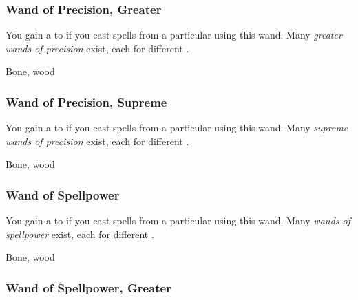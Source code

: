 \lowercase{\hypertarget{item:Wand of Precision, Greater}{}}\label{item:Wand of Precision, Greater}
\hypertarget{item:Wand of Precision, Greater}{\subsubsection{Wand of Precision, Greater\hfill{}}}

You gain a   to  if you cast spells from a particular  using this wand.
Many \textit{greater wands of precision} exist, each for different .



 


 Bone, wood


\lowercase{\hypertarget{item:Wand of Precision, Supreme}{}}\label{item:Wand of Precision, Supreme}
\hypertarget{item:Wand of Precision, Supreme}{\subsubsection{Wand of Precision, Supreme\hfill{}}}

You gain a   to  if you cast spells from a particular  using this wand.
Many \textit{supreme wands of precision} exist, each for different .



 


 Bone, wood


\lowercase{\hypertarget{item:Wand of Spellpower}{}}\label{item:Wand of Spellpower}
\hypertarget{item:Wand of Spellpower}{\subsubsection{Wand of Spellpower\hfill{}}}

You gain a   to  if you cast spells from a particular  using this wand.
Many \textit{wands of spellpower} exist, each for different .



 


 Bone, wood


\lowercase{\hypertarget{item:Wand of Spellpower, Greater}{}}\label{item:Wand of Spellpower, Greater}
\hypertarget{item:Wand of Spellpower, Greater}{\subsubsection{Wand of Spellpower, Greater\hfill{}}}

